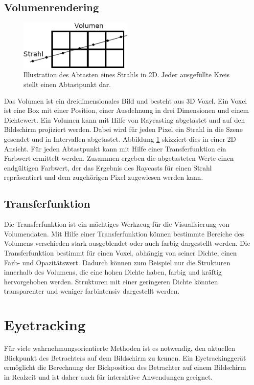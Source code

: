 \subsection{Volumenrendering}
\begin{figure}
	\centering
	\includegraphics[width=0.5\textwidth]{../../Grafiken/Abtasten_eines_Strahls.png}
	\caption{Illustration des Abtasten eines Strahls in 2D. Jeder ausgefüllte Kreis stellt einen Abtastpunkt dar.}
	\label{fig::rc04}
\end{figure}
Das Volumen ist ein dreidimensionales Bild und besteht aus 3D Voxel.
Ein Voxel ist eine Box mit einer Position, einer Ausdehnung in drei Dimensionen und einem Dichtewert.
Ein Volumen kann mit Hilfe von Raycasting abgetastet und auf den Bildschirm projiziert werden.
Dabei wird für jeden Pixel ein Strahl in die Szene gesendet und in Intervallen abgetastet.
Abbildung \ref{fig::rc04} skizziert dies in einer 2D Ansicht.
Für jeden Abtastpunkt kann mit Hilfe einer Transferfunktion ein Farbwert ermittelt werden.
Zusammen ergeben die abgetasteten Werte einen endgültigen Farbwert, der das Ergebnis des Raycasts für einen Strahl repräsentiert und dem zugehörigen Pixel zugewiesen werden kann.

\subsection{Transferfunktion}
Die Transferfunktion ist ein mächtiges Werkzeug für die Visualisierung von Volumendaten.
Mit Hilfe einer Transferfunktion können bestimmte Bereiche des Volumens verschieden stark ausgeblendet oder auch farbig dargestellt werden.
Die Transferfunktion bestimmt für einen Voxel, abhängig von seiner Dichte, einen Farb- und Opazitätswert.
Dadurch können zum Beispiel nur die Strukturen innerhalb des Volumens, die eine hohen Dichte haben, farbig und kräftig hervorgehoben werden.
Strukturen mit einer geringeren Dichte könnten transparenter und weniger farbintensiv dargestellt werden.

\section{Eyetracking}\label{sec::eyetr}
Für viele wahrnehmungsorientierte Methoden ist es notwendig, den aktuellen Blickpunkt des Betrachters auf dem Bildschirm zu kennen.
Ein Eyetrackinggerät ermöglicht die Berechnung der Bickposition des Betrachter auf einem Bildschirm in Realzeit und ist daher auch für interaktive Anwendungen geeignet.

